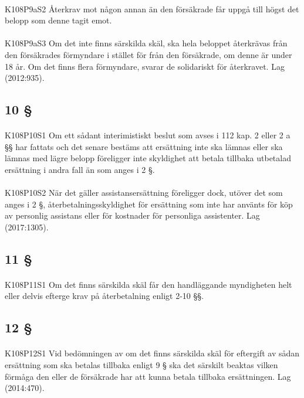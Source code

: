 \documentclass[a4paper,notitlepage,openany,10pt]{book}
\begin{document}
\paragraph*{}
{\tiny K108P9aS2}
Återkrav mot någon annan än den försäkrade får uppgå till högst det belopp som denne tagit emot.
\paragraph*{}
{\tiny K108P9aS3}
Om det inte finns särskilda skäl, ska hela beloppet återkrävas från den försäkrades förmyndare i stället för från den försäkrade, om denne är under 18 år. Om det finns flera förmyndare, svarar de solidariskt för återkravet.
Lag (2012:935).
\subsection*{10 §}
\paragraph*{}
{\tiny K108P10S1}
Om ett sådant interimistiskt beslut som avses i 112 kap. 2 eller 2 a §§ har fattats och det senare bestäms att ersättning inte ska lämnas eller ska lämnas med lägre belopp föreligger inte skyldighet att betala tillbaka utbetalad ersättning i andra fall än som anges i 2 §.
\paragraph*{}
{\tiny K108P10S2}
När det gäller assistansersättning föreligger dock, utöver det som anges i 2 §, återbetalningsskyldighet för ersättning som inte har använts för köp av personlig assistans eller för kostnader för personliga assistenter.
Lag (2017:1305).
\subsection*{11 §}
\paragraph*{}
{\tiny K108P11S1}
Om det finns särskilda skäl får den handläggande myndigheten helt eller delvis efterge krav på återbetalning enligt 2-10 §§.
\subsection*{12 §}
\paragraph*{}
{\tiny K108P12S1}
Vid bedömningen av om det finns särskilda skäl för eftergift av sådan ersättning som ska betalas tillbaka enligt 9 § ska det särskilt beaktas vilken förmåga den eller de försäkrade har att kunna betala tillbaka ersättningen.
Lag (2014:470).
\end{document}
